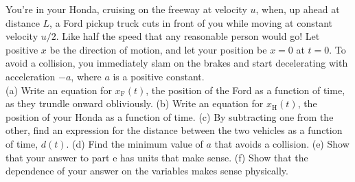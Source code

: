 You're in your Honda, cruising on the freeway at velocity $u$, when, up ahead at distance $L$, a Ford
pickup truck cuts in front of you while moving at constant velocity $u/2$.
Like half the speed that any reasonable person would go!
Let positive $x$ be the direction of motion, and let your position be
$x=0$ at $t=0$.
To avoid a collision, you immediately slam on the brakes and start decelerating with
acceleration $-a$, where $a$ is a positive constant.\\
%
(a) Write an equation for
$x_\text{F}(t)$, the position of the Ford as a function of time,
as they trundle onward obliviously.\answercheck\hwendpart
%
(b) Write an equation for $x_\text{H}(t)$, the
position of your Honda as a function of time.\answercheck\hwendpart
%
(c) By subtracting one from the other, find an expression for the
distance between the two vehicles as a function of time, $d(t)$.\answercheck\hwendpart
%
(d) Find the minimum value of $a$ that avoids a collision.\answercheck\hwendpart
%
(e) Show that your answer to part e has units that make sense.\hwendpart
%
(f) Show that the dependence of your answer on the variables makes sense physically.

